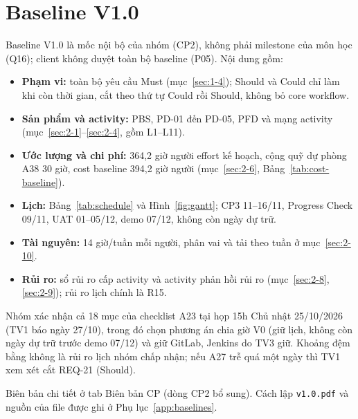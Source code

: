 \section{Baseline V1.0}
\label{sec:2-12}
Baseline V1.0 là mốc nội bộ của nhóm (CP2), không phải milestone của môn học (Q16); client không duyệt toàn bộ baseline (P05). Nội dung gồm:
\begin{itemize}
  \item \textbf{Phạm vi:} toàn bộ yêu cầu Must (mục~\ref{sec:1-4}); Should và Could chỉ làm khi còn thời gian, cắt theo thứ tự Could rồi Should, không bỏ core workflow.
  \item \textbf{Sản phẩm và activity:} PBS, PD-01 đến PD-05, PFD và mạng activity (mục~\ref{sec:2-1}--\ref{sec:2-4}, gồm L1--L11).
  \item \textbf{Ước lượng và chi phí:} 364,2 giờ người effort kế hoạch, cộng quỹ dự phòng A38 30 giờ, cost baseline 394,2 giờ người (mục~\ref{sec:2-6}, Bảng~\ref{tab:cost-baseline}).
  \item \textbf{Lịch:} Bảng~\ref{tab:schedule} và Hình~\ref{fig:gantt}; CP3 11--16/11, Progress Check 09/11, UAT 01--05/12, demo 07/12, không còn ngày dự trữ.
  \item \textbf{Tài nguyên:} 14 giờ/tuần mỗi người, phân vai và tải theo tuần ở mục~\ref{sec:2-10}.
  \item \textbf{Rủi ro:} sổ rủi ro cấp activity và activity phản hồi rủi ro (mục~\ref{sec:2-8}, \ref{sec:2-9}); rủi ro lịch chính là R15.
\end{itemize}

Nhóm xác nhận cả 18 mục của checklist A23 tại họp 15h Chủ nhật 25/10/2026 (TV1 báo ngày 27/10), trong đó chọn phương án chia giờ V0 (giữ lịch, không còn ngày dự trữ trước demo 07/12) và giữ GitLab, Jenkins do TV3 giữ. Khoảng đệm bằng không là rủi ro lịch nhóm chấp nhận; nếu A27 trễ quá một ngày thì TV1 xem xét cắt REQ-21 (Should).

Biên bản chi tiết ở tab Biên bản CP (dòng CP2 bổ sung). Cách lập \texttt{v1.0.pdf} và nguồn của file được ghi ở Phụ lục~\ref{app:baselines}.
